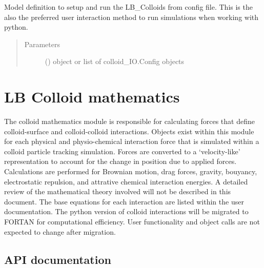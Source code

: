 \documentclass[letterpaper,10pt,english]{sphinxmanual}
\begin{document}

\begin{fulllineitems}
\label{\detokenize{index:lb_colloids.Colloids.LB_Colloid.run}}
Model definition to setup and run the LB\_Colloids from config file.
This is the also the preferred user interaction method to run simulations
when working with python.
\begin{quote}\begin{description}
\item[{Parameters}] \leavevmode
{} () \textendash{} object or list of colloid\_IO.Config objects

\end{description}\end{quote}

\end{fulllineitems}



\section{LB Colloid mathematics}
\label{\detokenize{index:lb-colloid-mathematics}}
The colloid mathematics module is responsible for calculating forces that define colloid-surface and colloid-colloid interactions. Objects exist within this module for each physical and physio-chemical interaction force that is simulated within a colloid particle tracking simulation. Forces are converted to a ‘velocity-like’ representation to account for the change in position due to applied forces. Calculations are performed for Brownian motion, drag forces, gravity, bouyancy, electrostatic repulsion, and attrative chemical interaction energies. A detailed review of the mathematical theory involved will not be described in this document. The base equations for each interaction are listed within the user documentation. The python version of colloid interactions will be migrated to FORTAN for computational efficiency. User functionality and object calls are not expected to change after migration.


\subsection{API documentation}
\label{\detokenize{index:id8}}\label{\detokenize{index:module-lb_colloids}}
\end{document}
